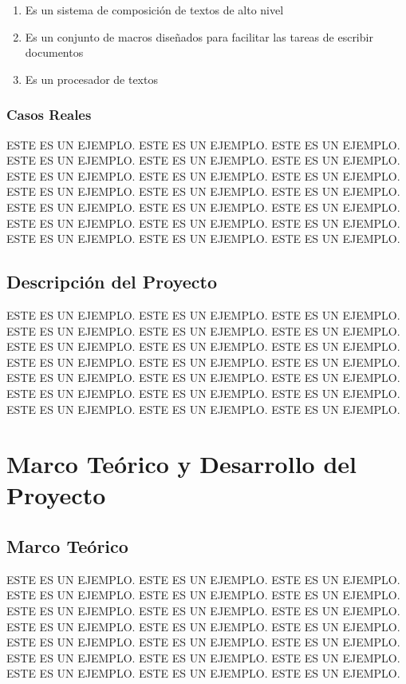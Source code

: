 \documentclass[12pt,spanish]{report}
\begin{document}
\begin{enumerate}
\item Es un sistema de composici\'on de textos de alto nivel
\item Es un conjunto de macros dise\~nados para facilitar las tareas de escribir documentos
\item Es un procesador de textos
\end{enumerate}

\subsection{Casos Reales}
ESTE ES UN EJEMPLO. ESTE ES UN EJEMPLO. ESTE ES UN EJEMPLO.
ESTE ES UN EJEMPLO. ESTE ES UN EJEMPLO. ESTE ES UN EJEMPLO.
ESTE ES UN EJEMPLO. ESTE ES UN EJEMPLO. ESTE ES UN EJEMPLO.
ESTE ES UN EJEMPLO. ESTE ES UN EJEMPLO. ESTE ES UN EJEMPLO.
ESTE ES UN EJEMPLO. ESTE ES UN EJEMPLO. ESTE ES UN EJEMPLO.
ESTE ES UN EJEMPLO. ESTE ES UN EJEMPLO. ESTE ES UN EJEMPLO.
ESTE ES UN EJEMPLO. ESTE ES UN EJEMPLO. ESTE ES UN EJEMPLO.

\section{Descripci\'on del Proyecto}
ESTE ES UN EJEMPLO. ESTE ES UN EJEMPLO. ESTE ES UN EJEMPLO.
ESTE ES UN EJEMPLO. ESTE ES UN EJEMPLO. ESTE ES UN EJEMPLO.
ESTE ES UN EJEMPLO. ESTE ES UN EJEMPLO. ESTE ES UN EJEMPLO.
ESTE ES UN EJEMPLO. ESTE ES UN EJEMPLO. ESTE ES UN EJEMPLO.
ESTE ES UN EJEMPLO. ESTE ES UN EJEMPLO. ESTE ES UN EJEMPLO.
ESTE ES UN EJEMPLO. ESTE ES UN EJEMPLO. ESTE ES UN EJEMPLO.
ESTE ES UN EJEMPLO. ESTE ES UN EJEMPLO. ESTE ES UN EJEMPLO.
\newpage

\chapter{Marco Te\'orico y Desarrollo del Proyecto}
\newpage

\section{Marco Te\'orico}
ESTE ES UN EJEMPLO. ESTE ES UN EJEMPLO. ESTE ES UN EJEMPLO.
ESTE ES UN EJEMPLO. ESTE ES UN EJEMPLO. ESTE ES UN EJEMPLO.
ESTE ES UN EJEMPLO. ESTE ES UN EJEMPLO. ESTE ES UN EJEMPLO.
ESTE ES UN EJEMPLO. ESTE ES UN EJEMPLO. ESTE ES UN EJEMPLO.
ESTE ES UN EJEMPLO. ESTE ES UN EJEMPLO. ESTE ES UN EJEMPLO.
ESTE ES UN EJEMPLO. ESTE ES UN EJEMPLO. ESTE ES UN EJEMPLO.
ESTE ES UN EJEMPLO. ESTE ES UN EJEMPLO. ESTE ES UN EJEMPLO.
\end{document}
